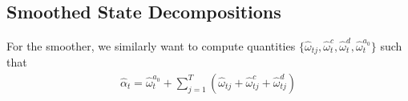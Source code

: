 \documentclass[12pt]{article}
\begin{document}
	\subsection{Smoothed State Decompositions}
	\newcommand\omegar{\stackrel{r}{\omega}}
	\newcommand\omegarzero{\stackrel{r^{(0)}}{\omega}}
	\newcommand\omegarone{\stackrel{r^{(1)}}{\omega}}




	For the smoother, we similarly want to compute quantities $\{\hat{\omega}_{tj}, \hat{\omega}_t^c, \hat{\omega}_t^d, \hat{\omega}_t^{a_0}\}$ such that 
	\begin{align*}
	\hat{\alpha}_t = \hat{\omega}_t^{a_0} + \sum_{j=1}^{T} \left( \hat{\omega}_{tj} + \hat{\omega}_{tj}^c + \hat{\omega}_{tj}^d \right)
	\end{align*}
\end{document}
